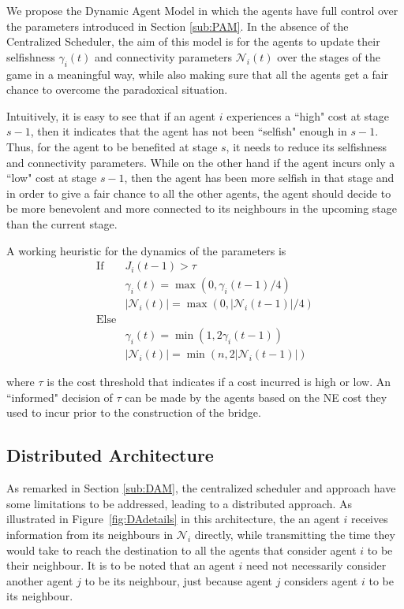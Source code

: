 \documentclass[11pt, letterpaper]{article}
\begin{document}
We propose the Dynamic Agent Model in which the agents have full control over the parameters introduced in Section \ref{sub:PAM}. In the absence of the Centralized Scheduler, the aim of this model is for the agents to update their selfishness $\gamma_i(t)$ and connectivity parameters  $\mathcal{N}_i(t)$ over the stages of the game in a meaningful way, while also making sure that all the agents get a fair chance to overcome the paradoxical situation. 

Intuitively, it is easy to see that if an agent $i$ experiences a ``high" cost at stage $s-1$, then it indicates that the agent has not been ``selfish" enough in $s-1$. Thus, for the agent to be benefited at stage $s$, it needs to reduce its selfishness and connectivity parameters. While on the other hand if the agent incurs only a ``low" cost at stage $s-1$, then the agent has been more selfish in that stage and in order to give a fair chance to all the other agents, the agent should decide to be more benevolent and more connected to its neighbours in the upcoming stage than the current stage. 

A working heuristic for the dynamics of the parameters is 
\begin{align}\label{eqn:dynamicsheuristic}
     \text{If} \quad &J_i(t-1) > \tau\nonumber\\
        \quad&\gamma_i(t) = \max(0,\gamma_i(t-1)/4)\nonumber\\
        \quad&|\mathcal{N}_i(t)| = \max(0,|\mathcal{N}_i(t-1)|/4)\nonumber\\
      \text{Else}&\nonumber\\
        \quad&\gamma_i(t) = \min(1,2\gamma_i(t-1))\nonumber\\
        \quad&|\mathcal{N}_i(t)| = \min(n,2|\mathcal{N}_i(t-1)|)        
\end{align}

where $\tau$ is the cost threshold that indicates if a cost incurred is high or low. An ``informed" decision of $\tau$ can be made by the agents based on the NE cost they used to incur prior to the construction of the bridge.

\subsection{Distributed Architecture}
As remarked in Section \ref{sub:DAM}, the centralized scheduler and approach have some limitations to be addressed, leading to a distributed approach. As illustrated in Figure~\ref{fig:DAdetails} in this architecture, the an agent $i$ receives information from its neighbours in $\mathcal{N}_i$ directly, while transmitting the time they would take to reach the destination to all the agents that consider agent $i$ to be their neighbour. It is to be noted that an agent $i$ need not necessarily consider another agent $j$ to be its neighbour, just because agent $j$ considers agent $i$ to be its neighbour.
\end{document}
